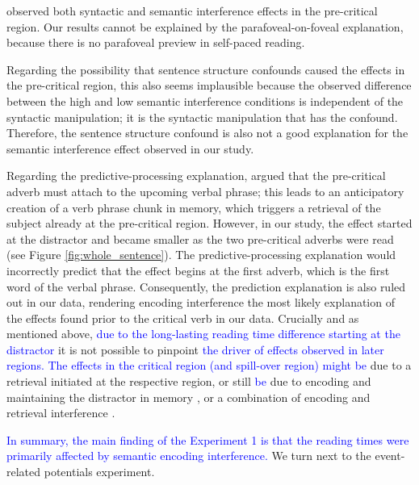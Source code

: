 \documentclass[review,preprint,12pt,authoryear,floatsintext]{elsarticle}
\begin{document}
\cite{mertzen} observed both syntactic and semantic interference effects in the pre-critical region. {}\label{confound} Our results cannot be explained by the parafoveal-on-foveal explanation, because there is no parafoveal preview in self-paced reading. 

Regarding the possibility that sentence structure confounds caused the effects in the pre-critical region, this also seems implausible because the observed difference between the high and low semantic interference conditions is independent of the syntactic manipulation; it is the syntactic manipulation that has the confound. Therefore, the sentence structure confound is also not a good explanation for the semantic interference effect observed in our study. 

Regarding the predictive-processing explanation, \citet{mertzen} argued that the pre-critical adverb must attach to the upcoming verbal phrase; this leads to an anticipatory creation of a verb phrase chunk in memory, which triggers a retrieval of the subject already at the pre-critical region. However, in our study, the effect started at the distractor and became smaller as the two pre-critical adverbs were read (see Figure \ref{fig:whole_sentence}). The predictive-processing explanation would incorrectly predict that the effect begins at the first adverb, which is the first word of the verbal phrase. Consequently, the prediction explanation is also ruled out in our data, rendering encoding interference the most likely explanation of the effects found prior to the critical verb in our data. Crucially and as mentioned above, \textcolor{blue}{due to the long-lasting reading time difference starting at the distractor} it is not possible to pinpoint \textcolor{blue}{the driver of effects observed in later regions. The effects in the critical region (and spill-over region) might be} due to a retrieval initiated at the respective region, or still \textcolor{blue}{be} due to encoding and maintaining the distractor in memory \citep{ness2017}, or a combination of encoding and retrieval interference \citep{Yadavetal2022}.

\textcolor{blue}{In summary, the main finding of the Experiment 1 is that the reading times were primarily affected by semantic encoding interference.} We turn next to the event-related potentials experiment.
\end{document}

